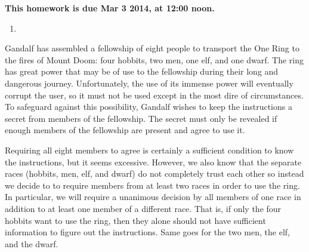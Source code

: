 \documentclass[]{article}
\newif\ifsolutions
\renewcommand{\answer}[1]{{\color{mydarkblue}\textbf{Solution:}#1}}
\begin{document}
\maketitle
{}
\vspace{0.5em}
{\Large{\textbf{This homework is due Mar 3 2014, at 12:00 noon.}}}

\begin{qunlist}
  
\begin{enumerate}
\qpart
\item
\ifsolutions{ \answer 
{
}}\fi


\ifsolutions{ \answer {
\textbf{Motivation}
}}\fi
\end{enumerate}

  



Gandalf has assembled a fellowship of eight people to transport the One Ring to the fires of Mount Doom: four hobbits, two men, one elf, and one dwarf. The ring has great power that may be of use to the fellowship during their long and dangerous journey. Unfortunately, the use of its immense power will eventually corrupt the user, so it must not be used except in the most dire of circumstances. To safeguard against this possibility, Gandalf wishes to keep the instructions a secret from members of the fellowship. The secret must only be revealed if enough members of the fellowship are present and agree to use it.

Requiring all eight members to agree is certainly a sufficient condition to know the instructions, but it seems excessive. However, we also know that the separate races (hobbits, men, elf, and dwarf) do not completely trust each other so instead we decide to to require members from at least two races in order to use the ring. In particular, we will require a unanimous decision by all members of one race in addition to at least one member of a different race. That is, if only the four hobbits want to use the ring, then they alone should not have sufficient information to figure out the instructions. Same goes for the two men, the elf, and the dwarf.


\end{qunlist}
\end{document}

